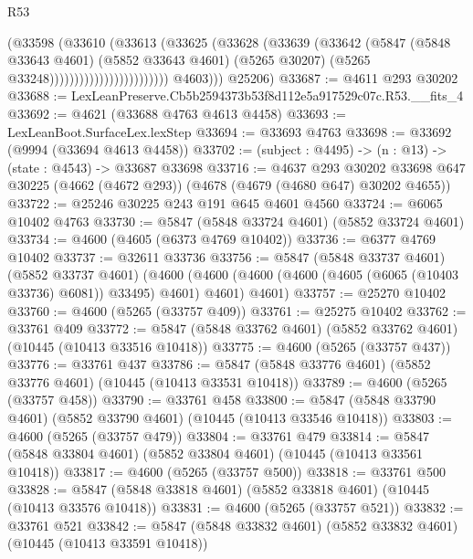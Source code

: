 \begin{lexlean}{R53}
\begin{coremodule}
                                          (@33598
                                            (@33610
                                              (@33613
                                                (@33625
                                                  (@33628
                                                    (@33639
                                                      (@33642
                                                        (@5847
                                                          (@5848 @33643 @4601)
                                                          (@5852 @33643 @4601)
                                                          (@5265 @30207)
                                                          (@5265 @33248))))))))))))))))))))))))
            @4603)))
      @25206)
@33687 := @4611 @293 @30202
@33688 := LexLeanPreserve.Cb5b2594373b53f8d112e5a917529c07c.R53.__fits_4
@33692 := @4621 (@33688 @4763 @4613 @4458)
@33693 := LexLeanBoot.SurfaceLex.lexStep
@33694 := @33693 @4763
@33698 := @33692 (@9994 (@33694 @4613 @4458))
@33702 := (subject : @4495) -> (n : @13) -> (state : @4543) -> @33687 @33698
@33716 := @4637
    @293
    @30202
    @33698
    @647
    @30225
    (@4662 (@4672 @293))
    (@4678 (@4679 (@4680 @647) @30202 @4655))
@33722 := @25246 @30225 @243 @191 @645 @4601 @4560
@33724 := @6065 @10402 @4763
@33730 := @5847 (@5848 @33724 @4601) (@5852 @33724 @4601)
@33734 := @4600 (@4605 (@6373 @4769 @10402))
@33736 := @6377 @4769 @10402
@33737 := @32611 @33736
@33756 := @5847
    (@5848 @33737 @4601)
    (@5852 @33737 @4601)
    (@4600 (@4600 (@4600 (@4600 (@4605 (@6065 (@10403 @33736) @6081)) @33495) @4601) @4601) @4601)
@33757 := @25270 @10402
@33760 := @4600 (@5265 (@33757 @409))
@33761 := @25275 @10402
@33762 := @33761 @409
@33772 := @5847 (@5848 @33762 @4601) (@5852 @33762 @4601) (@10445 (@10413 @33516 @10418))
@33775 := @4600 (@5265 (@33757 @437))
@33776 := @33761 @437
@33786 := @5847 (@5848 @33776 @4601) (@5852 @33776 @4601) (@10445 (@10413 @33531 @10418))
@33789 := @4600 (@5265 (@33757 @458))
@33790 := @33761 @458
@33800 := @5847 (@5848 @33790 @4601) (@5852 @33790 @4601) (@10445 (@10413 @33546 @10418))
@33803 := @4600 (@5265 (@33757 @479))
@33804 := @33761 @479
@33814 := @5847 (@5848 @33804 @4601) (@5852 @33804 @4601) (@10445 (@10413 @33561 @10418))
@33817 := @4600 (@5265 (@33757 @500))
@33818 := @33761 @500
@33828 := @5847 (@5848 @33818 @4601) (@5852 @33818 @4601) (@10445 (@10413 @33576 @10418))
@33831 := @4600 (@5265 (@33757 @521))
@33832 := @33761 @521
@33842 := @5847 (@5848 @33832 @4601) (@5852 @33832 @4601) (@10445 (@10413 @33591 @10418))

\end{coremodule}
\end{lexlean}
